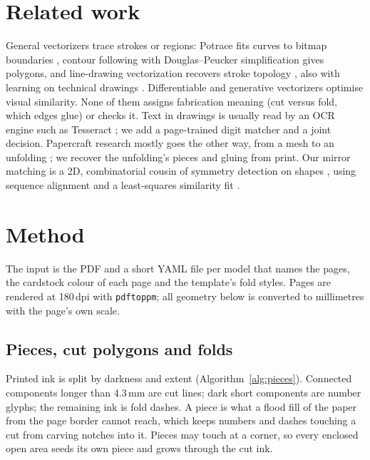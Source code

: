 \section{Related work}

General vectorizers trace strokes or regions: Potrace fits curves to bitmap
boundaries \cite{selinger2003potrace}, contour following \cite{suzuki1985} with
Douglas--Peucker simplification \cite{douglas1973} gives polygons, and line-drawing
vectorization recovers stroke topology \cite{hilaire2006,noris2013,bessmeltsev2019}, also with
learning on technical drawings \cite{egiazarian2020}. Differentiable and generative
vectorizers \cite{li2020diffvg,ma2022live,rodriguez2023starvector} optimise visual similarity.
None of them assigns fabrication meaning (cut versus fold, which edges glue) or checks it. Text
in drawings is usually read by an OCR engine such as Tesseract \cite{smith2007tesseract}; we add
a page-trained digit matcher and a joint decision. Papercraft research mostly goes the other
way, from a mesh to an unfolding \cite{mitani2004,takahashi2011}; we recover the unfolding's
pieces and gluing from print. Our mirror matching is a 2D, combinatorial cousin of symmetry
detection on shapes \cite{mitra2006symmetry}, using sequence alignment \cite{needleman1970}
and a least-squares similarity fit \cite{umeyama1991}.

\section{Method}
\label{sec:method}

The input is the PDF and a short YAML file per model that names the pages, the cardstock colour
of each page and the template's fold styles. Pages are rendered at 180\,dpi with
\texttt{pdftoppm}; all geometry below is converted to millimetres with the page's own scale.

\subsection{Pieces, cut polygons and folds}

Printed ink is split by darkness and extent (Algorithm~\ref{alg:pieces}). Connected components
longer than 4.3\,mm are cut lines; dark short components are number glyphs; the remaining
ink is fold dashes. A piece is what a flood fill of the paper from the page border cannot reach,
which keeps numbers and dashes touching a cut from carving notches into it. Pieces may touch at a
corner, so every enclosed open area seeds its own piece and grows through the cut ink.

